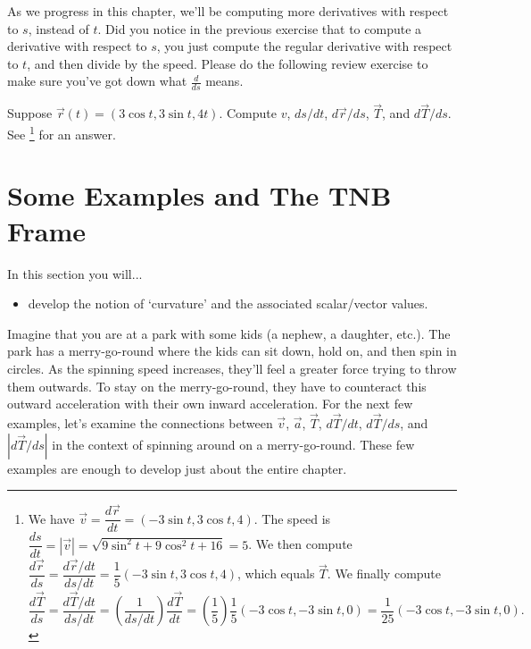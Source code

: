 As we progress in this chapter, we'll be computing more derivatives with respect to $s$, instead of $t$. Did you notice in the previous exercise that to compute a derivative with respect to $s$, you just compute the regular derivative with respect to $t$, and then divide by the speed. Please do the following review exercise to make sure you've got down what $\frac{d}{ds}$ means. 

\begin{review*}
 Suppose $\vec r(t)=(3\cos t,3\sin t,4t)$.  Compute $v$, $ds/dt$, $d\vec r/ds$, $\vec T$, and $d\vec T/ds$. See 
\footnote{
We have $\vec v = \dfrac{d\vec r}{dt} = (-3\sin t, 3\cos t, 4)$. 
The speed is $\dfrac{ds}{dt}=|\vec v| = \sqrt{9\sin^2t+9\cos^2t+16}=5$.  
We then compute $\dfrac{d\vec r}{ds}=\dfrac{d\vec r/dt}{ds/dt} = \dfrac{1}{5}(-3\sin t, 3\cos t, 4)$, 
which equals $\vec T$.
We finally compute
$$
\dfrac{d\vec T}{ds}=\dfrac{d\vec T/dt}{ds/dt}=\left(\dfrac{1}{ds/dt}\right)\dfrac{d\vec T}{dt} = \left(\dfrac{1}{5}\right)\dfrac{1}{5}(-3\cos t, -3\sin t, 0) =  \dfrac{1}{25}(-3\cos t, -3\sin t, 0).  
$$
} for an answer.
\end{review*}


\section{Some Examples and The TNB Frame}
In this section you will...
\begin{itemize}
\item develop the notion of `curvature' and the associated scalar/vector values. 
\end{itemize}


Imagine that you are at a park with some kids (a nephew, a daughter, etc.).  The park has a merry-go-round where the kids can sit down, hold on, and then spin in circles. As the spinning speed increases, they'll feel a greater  force trying to throw them  outwards. To stay on the merry-go-round, they have to counteract this outward acceleration with their own inward acceleration. For the next few examples, let's examine the connections between $\vec v$, $\vec a$, $\vec T$, $d\vec T/dt$, $d\vec T/ds$, and $|d\vec T/ds|$ in the context of spinning around on a merry-go-round. These few examples are enough to develop just about the entire chapter. 

